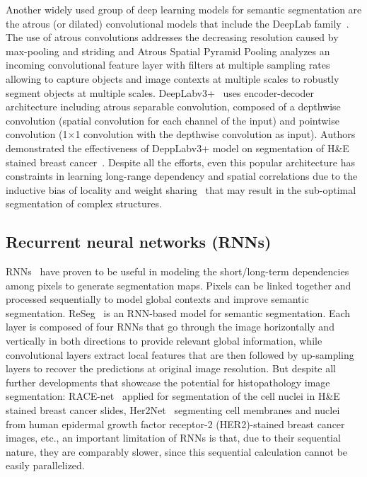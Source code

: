 Another widely used group of deep learning models for semantic segmentation are the atrous (or dilated)
convolutional models that include the DeepLab family~\cite{chen2017deeplab, chen2017rethinking}.
The use of atrous convolutions addresses the decreasing resolution caused by max-pooling and striding and
Atrous Spatial Pyramid Pooling analyzes an incoming convolutional feature layer with filters at multiple
sampling rates allowing to capture objects and image contexts at multiple scales to robustly segment objects
at multiple scales. DeepLabv3+~\cite{chen2018encoder} uses encoder-decoder architecture including atrous
separable convolution, composed of a depthwise convolution (spatial convolution for each channel of the
input) and pointwise convolution (1$\times$1 convolution with the depthwise convolution as input).
Authors~\cite{chen2018encoder} demonstrated the effectiveness of DeppLabv3+ model on
segmentation of H\&E stained breast cancer~\cite{priego2020automatic}. 
Despite all the efforts, even this popular architecture has constraints in learning long-range
dependency and spatial correlations due to the inductive bias of locality and weight
sharing~\cite{xie2021cotr} that may result in the sub-optimal segmentation of complex structures. 

\subsection{Recurrent neural networks (RNNs)}
RNNs~\cite{rumelhart1986learning} have proven to be useful in modeling the short/long-term dependencies
among pixels to generate segmentation maps. Pixels can be linked together and processed sequentially to
model global contexts and improve semantic segmentation. ReSeg~\cite{visin2016reseg} is an RNN-based
model for semantic segmentation. Each layer is composed of four RNNs that go through the image
horizontally and vertically in both directions to provide relevant global information,
while convolutional layers extract local features that are then followed by up-sampling layers
to recover the predictions at original image resolution. But despite all further developments that showcase the potential for
histopathology image segmentation: RACE-net~\cite{chakravarty2018race} applied for segmentation of the
cell nuclei in H\&E stained breast cancer slides, Her2Net~\cite{saha2018her2net} segmenting cell membranes
and nuclei from human epidermal growth factor receptor-2 (HER2)-stained breast cancer images, etc., 
an important limitation of RNNs is that, due to their sequential nature, they are comparably slower,
since this sequential calculation cannot be easily parallelized. 

